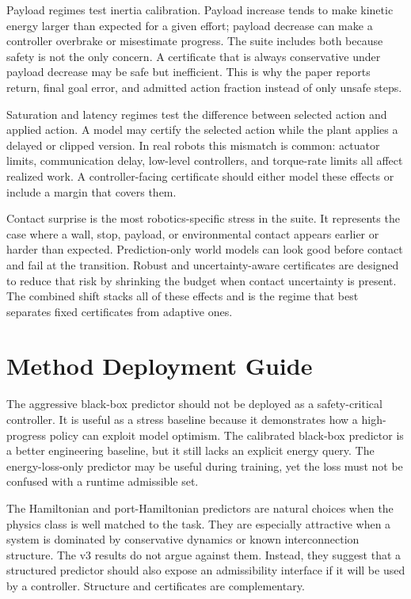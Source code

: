 \documentclass{article}
\begin{document}
Payload regimes test inertia calibration. Payload increase tends to make kinetic energy larger than expected for a given effort; payload decrease can make a controller overbrake or misestimate progress. The suite includes both because safety is not the only concern. A certificate that is always conservative under payload decrease may be safe but inefficient. This is why the paper reports return, final goal error, and admitted action fraction instead of only unsafe steps.

Saturation and latency regimes test the difference between selected action and applied action. A model may certify the selected action while the plant applies a delayed or clipped version. In real robots this mismatch is common: actuator limits, communication delay, low-level controllers, and torque-rate limits all affect realized work. A controller-facing certificate should either model these effects or include a margin that covers them.

Contact surprise is the most robotics-specific stress in the suite. It represents the case where a wall, stop, payload, or environmental contact appears earlier or harder than expected. Prediction-only world models can look good before contact and fail at the transition. Robust and uncertainty-aware certificates are designed to reduce that risk by shrinking the budget when contact uncertainty is present. The combined shift stacks all of these effects and is the regime that best separates fixed certificates from adaptive ones.

\section{Method Deployment Guide}

The aggressive black-box predictor should not be deployed as a safety-critical controller. It is useful as a stress baseline because it demonstrates how a high-progress policy can exploit model optimism. The calibrated black-box predictor is a better engineering baseline, but it still lacks an explicit energy query. The energy-loss-only predictor may be useful during training, yet the loss must not be confused with a runtime admissible set.

The Hamiltonian and port-Hamiltonian predictors are natural choices when the physics class is well matched to the task. They are especially attractive when a system is dominated by conservative dynamics or known interconnection structure. The v3 results do not argue against them. Instead, they suggest that a structured predictor should also expose an admissibility interface if it will be used by a controller. Structure and certificates are complementary.
\end{document}
